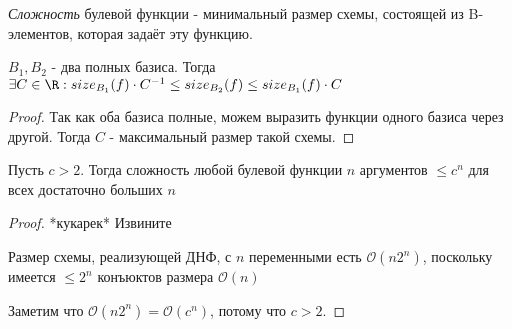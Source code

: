 \begin{definition} \thmslashn

	\textit{Сложность} булевой функции - минимальный размер схемы, состоящей из B-элементов, которая задаёт эту функцию.
\end{definition}

\begin{theorem}

	$B_1, B_2$ - два полных базиса. Тогда $\exists C \in \R : size_{B_1}(f)\cdot C^{-1} \leq size_{B_2}(f) \leq size_{B_1}(f)\cdot C$
	\begin{proof} \thmslashn
	
		Так как оба базиса полные, можем выразить функции одного базиса через другой. Тогда $C$ - максимальный размер такой схемы.
	\end{proof}
\end{theorem}

\begin{theorem} \thmslashn

	Пусть $c > 2$. Тогда сложность любой булевой функции $n$ аргументов $\leq c^n$ для всех достаточно больших $n$
	\begin{proof} \thmslashn
	
		*кукарек* Извините
		
		Размер схемы, реализующей ДНФ, с $n$ переменными есть $\mathcal{O}(n2^n)$, поскольку имеется $\leq 2^n$ конъюктов размера $\mathcal{O}(n)$
		
		Заметим что $\mathcal{O}(n2^n) = \mathcal{O}(c^n)$, потому что $c > 2$.
	\end{proof}
\end{theorem}

